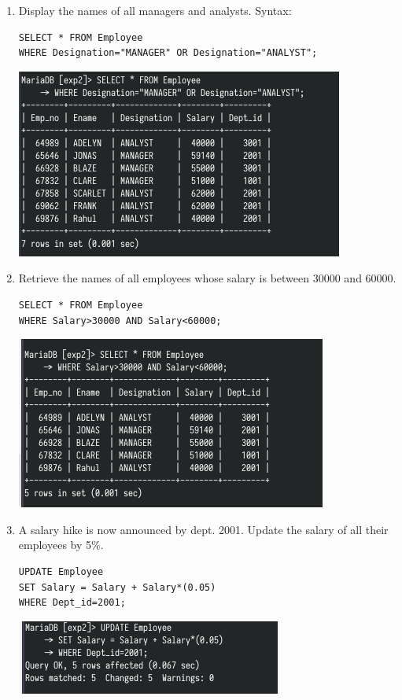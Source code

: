 \documentclass[13pt,oneside]{book}
\begin{document}
\begin{enumerate}
	\item
	Display the names of all managers and analysts.
Syntax:
    \begin{verbatim}
SELECT * FROM Employee
WHERE Designation="MANAGER" OR Designation="ANALYST";
    \end{verbatim}
	\includegraphics[]{img/p2/ss9.png}
	
		\item
Retrieve the names of all employees whose salary is between 30000
and 60000.
    \begin{verbatim}
SELECT * FROM Employee
WHERE Salary>30000 AND Salary<60000;
    \end{verbatim}
	\includegraphics[]{img/p2/ss10.png}
	
		\item
A salary hike is now announced by dept. 2001. Update the salary of all
their employees by 5\%.

    \begin{verbatim}
UPDATE Employee
SET Salary = Salary + Salary*(0.05)
WHERE Dept_id=2001;
    \end{verbatim}
	\includegraphics[]{img/p2/ss11.png}
	

\end{enumerate}
\end{document}

